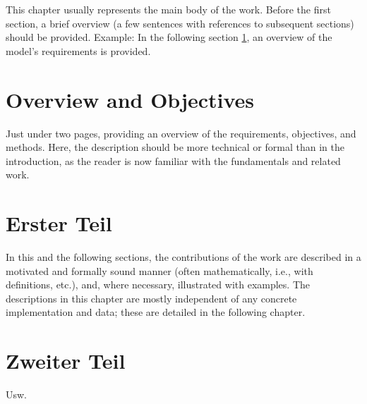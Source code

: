 This chapter usually represents the main body of the work. Before the first section, a brief overview (a few sentences with references to subsequent sections) should be provided. Example: In the following section \ref{sec:overview}, an overview of the model's requirements is provided. 

\section{Overview and Objectives}
\label{sec:overview} 

Just under two pages, providing an overview of the requirements, objectives, and methods. Here, the description should be more technical or formal than in the introduction, as the reader is now familiar with the fundamentals and related work.

\section{Erster Teil}
\label{sec:teil1}

In this and the following sections, the contributions of the work are described in a motivated and formally sound manner (often mathematically, i.e., with definitions, etc.), and, where necessary, illustrated with examples. The descriptions in this chapter are mostly independent of any concrete implementation and data; these are detailed in the following chapter.

\section{Zweiter Teil}
\label{sec:teil2}

Usw.